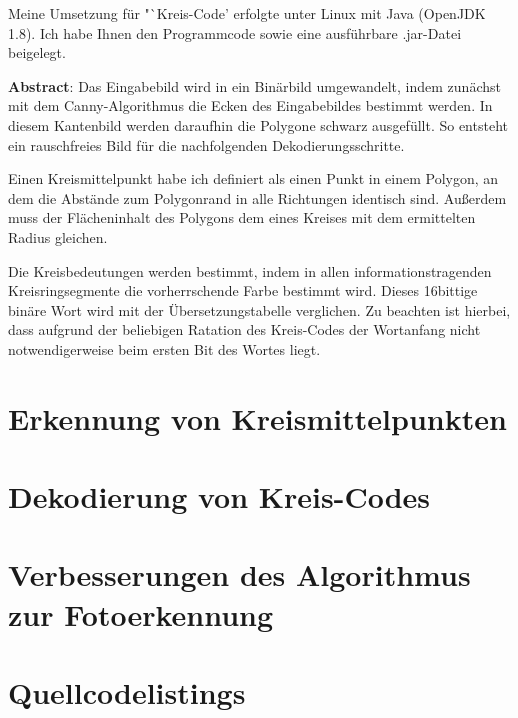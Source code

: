 \documentclass[a4paper, DIV=12, firstfoot=false, dvipsnames]{scrreprt}
\newcommand{\task}[1]{Kreis-Code}
\begin{document}
	\titlehead{Teilnahme 6745 (Team 00001) \hfill Laurenz Grote}
	\title{\task}
	\subtitle{Aufgabe 3}
	\author{Laurenz Friedrich Grote}
	\date{}
	\maketitle
	\tableofcontents
	\vspace {2em}
	Meine Umsetzung für "`\task"' erfolgte unter Linux mit Java (OpenJDK 1.8). Ich habe Ihnen den Programmcode sowie eine ausführbare .jar-Datei beigelegt.
	
	\vfill{}
	\textbf{Abstract}:
	Das Eingabebild wird in ein Binärbild umgewandelt, indem zunächst mit dem Canny-Algorithmus die Ecken des Eingabebildes bestimmt werden. In diesem Kantenbild werden daraufhin die Polygone schwarz ausgefüllt. So entsteht ein rauschfreies Bild für die nachfolgenden Dekodierungsschritte.

	Einen Kreismittelpunkt habe ich definiert als einen Punkt in einem Polygon, an dem die Abstände zum Polygonrand in alle Richtungen identisch sind. Außerdem muss der Flächeninhalt des Polygons dem eines Kreises mit dem ermittelten Radius gleichen.

	Die Kreisbedeutungen werden bestimmt, indem in allen informationstragenden Kreisringsegmente die vorherrschende Farbe bestimmt wird. Dieses 16bittige binäre Wort wird mit der Übersetzungstabelle verglichen. Zu beachten ist hierbei, dass aufgrund der beliebigen Ratation des \task{}s der Wortanfang nicht notwendigerweise beim ersten Bit des Wortes liegt.

	\pagebreak
	\chapter{Erkennung von Kreismittelpunkten}
		
	\chapter{Dekodierung von Kreis-Codes}
		
	\chapter{Verbesserungen des Algorithmus zur Fotoerkennung}
		
	\chapter{Quellcodelistings}
		
\end{document}
